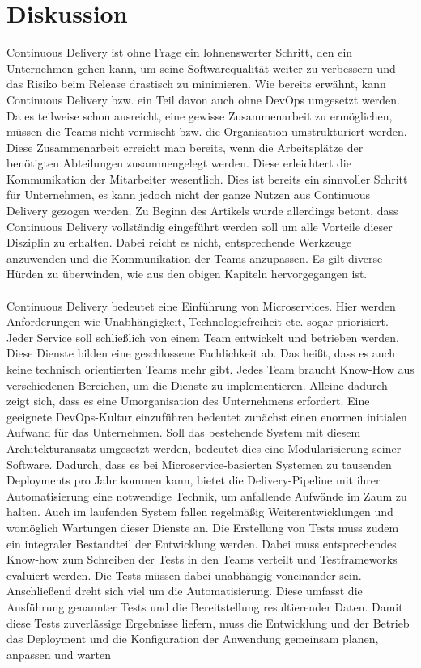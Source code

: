 \section{Diskussion}
Continuous Delivery ist ohne Frage ein lohnenswerter Schritt, den ein Unternehmen gehen kann, um seine Softwarequalität weiter zu verbessern und das Risiko beim Release drastisch zu minimieren. Wie bereits erwähnt, kann Continuous Delivery bzw. ein Teil davon auch ohne DevOps umgesetzt werden. Da es teilweise schon ausreicht, eine gewisse Zusammenarbeit zu ermöglichen, müssen die Teams nicht vermischt bzw. die Organisation umstrukturiert werden. Diese Zusammenarbeit erreicht man bereits, wenn die Arbeitsplätze der benötigten Abteilungen zusammengelegt werden. Diese erleichtert die Kommunikation der Mitarbeiter wesentlich. Dies ist bereits ein sinnvoller Schritt für Unternehmen, es kann jedoch nicht der ganze Nutzen aus Continuous Delivery gezogen werden. Zu Beginn des Artikels wurde allerdings betont, dass Continuous Delivery vollständig eingeführt werden soll um alle Vorteile dieser Disziplin zu erhalten. Dabei reicht es nicht, entsprechende Werkzeuge anzuwenden und die Kommunikation der Teams anzupassen. Es gilt diverse Hürden zu überwinden, wie aus den obigen Kapiteln hervorgegangen ist. \\ \\
Continuous Delivery bedeutet eine Einführung von Microservices. Hier werden Anforderungen wie Unabhängigkeit, Technologiefreiheit etc. sogar priorisiert. Jeder Service soll schließlich von einem Team entwickelt und betrieben werden. Diese Dienste bilden eine geschlossene Fachlichkeit ab. Das heißt, dass es auch keine technisch orientierten Teams mehr gibt. Jedes Team braucht Know-How aus verschiedenen Bereichen, um die Dienste zu implementieren. Alleine dadurch zeigt sich, dass es eine Umorganisation des Unternehmens erfordert. Eine geeignete DevOps-Kultur einzuführen bedeutet zunächst einen enormen initialen Aufwand für das Unternehmen. Soll das bestehende System mit diesem Architekturansatz umgesetzt werden, bedeutet dies eine Modularisierung seiner Software. Dadurch, dass es bei Microservice-basierten Systemen zu tausenden Deployments pro Jahr kommen kann, bietet die Delivery-Pipeline mit ihrer Automatisierung eine notwendige Technik, um anfallende Aufwände im Zaum zu halten. Auch im laufenden System fallen regelmäßig Weiterentwicklungen und womöglich Wartungen dieser Dienste an. Die Erstellung von Tests muss zudem ein integraler Bestandteil der Entwicklung werden. Dabei muss entsprechendes Know-how zum Schreiben der Tests in den Teams verteilt und Testframeworks evaluiert werden. Die Tests müssen dabei unabhängig voneinander sein. Anschließend dreht sich viel um die Automatisierung. Diese umfasst die Ausführung genannter Tests und die Bereitstellung resultierender Daten. Damit diese Tests zuverlässige Ergebnisse liefern, muss die Entwicklung und der Betrieb das Deployment und die Konfiguration der Anwendung gemeinsam planen, anpassen und warten \cite{Birk.2014} \\ \\
